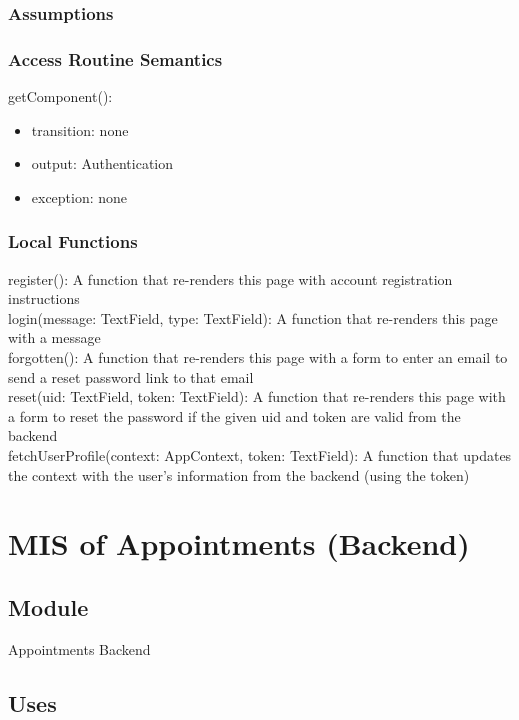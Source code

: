 \documentclass[12pt, titlepage]{article}
\begin{document}
\subsubsection{Assumptions}

\subsubsection{Access Routine Semantics}

\noindent getComponent():
\begin{itemize}
\item transition: none
\item output: Authentication
\item exception: none
\end{itemize}

\subsubsection{Local Functions}
register(): A function that re-renders this page with account registration instructions \\
login(message: TextField, type: TextField): A function that re-renders this page with a message \\
forgotten(): A function that re-renders this page with a form to enter an email to send a reset password link to that email \\
reset(uid: TextField, token: TextField): A function that re-renders this page with a form to reset the password if the given uid and token are valid from the backend \\
fetchUserProfile(context: AppContext, token: TextField): A function that updates the context with the user's information from the backend (using the token)

\newpage

\section{MIS of Appointments (Backend)}

\subsection{Module}

Appointments Backend

\subsection{Uses}
\end{document}
